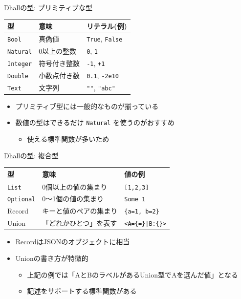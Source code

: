 \documentclass[unicode,12pt]{beamer}
\begin{document}
\begin{frame}{Dhallの型: プリミティブな型}
  \centering
  \begin{tabular}{lll} \hline
    型 & 意味 & リテラル(例)\\ \hline
    \texttt{Bool} & 真偽値 & \texttt{True}, \texttt{False}\\
    \texttt{Natural} & 0以上の整数 & \texttt{0}, \texttt{1}\\
    \texttt{Integer} & 符号付き整数 & \texttt{-1}, \texttt{+1}\\
    \texttt{Double} & 小数点付き数 & \texttt{0.1}, \texttt{-2e10}\\
    \texttt{Text} & 文字列 & \texttt{""}, \texttt{"abc"}\\ \hline
  \end{tabular}

  \begin{itemize}
  \item プリミティブ型には一般的なものが揃っている
  \item 数値の型はできるだけ \texttt{Natural} を使うのがおすすめ
    \begin{itemize}
    \item 使える標準関数が多いため
    \end{itemize}
  \end{itemize}
\end{frame}

\begin{frame}{Dhallの型: 複合型}
  \centering
  \begin{tabular}{lll} \hline
    型 & 意味 & 値の例\\ \hline
    \texttt{List} & 0個以上の値の集まり & \lstinline|[1,2,3]| \\
    \texttt{Optional} & 0〜1個の値の集まり & \lstinline|Some 1| \\
    Record & キーと値のペアの集まり & \lstinline|{a=1, b=2}| \\
    Union & 「どれかひとつ」を表す & {\footnotesize\texttt{<A=\{=\}|B:\{\}>}} \\ \hline
  \end{tabular}

  \begin{itemize}
  \item RecordはJSONのオブジェクトに相当
  \item Unionの書き方が特徴的
    \begin{itemize}
    \item 上記の例では「AとBのラベルがあるUnion型でAを選んだ値」となる
    \item 記述をサポートする標準関数がある
    \end{itemize}
  \end{itemize}
\end{frame}
\end{document}
